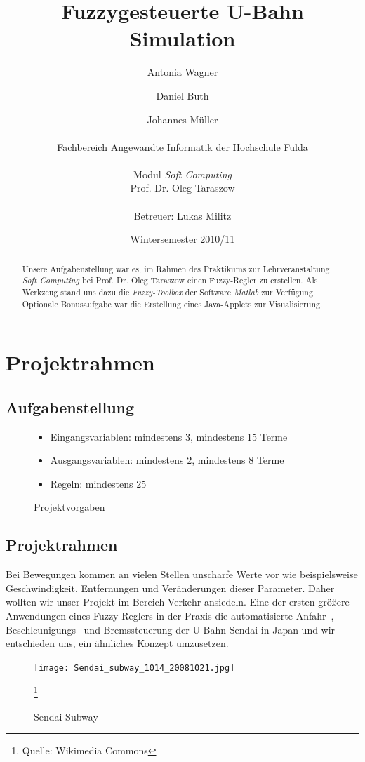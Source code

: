 \documentclass[10pt,a4paper]{article}
\author{Antonia Wagner \and Daniel Buth \and Johannes Müller \\ \\
Fachbereich Angewandte Informatik der Hochschule Fulda\\ \\
Modul \textit{Soft Computing}\\
Prof. Dr. Oleg Taraszow\\ \\
Betreuer: Lukas Militz
}
\title{Fuzzygesteuerte U-Bahn Simulation}
\date{Wintersemester 2010/11}
\begin{document}
\maketitle
\tableofcontents

\section{Projektrahmen}
\subsection{Aufgabenstellung}
\begin{abstract}
Unsere Aufgabenstellung war es, im Rahmen des Praktikums zur Lehrveranstaltung \textit{Soft Computing} bei Prof. Dr. Oleg Taraszow einen Fuzzy-Regler zu erstellen.
Als Werkzeug stand uns dazu die \textit{Fuzzy-Toolbox} der Software \textit{Matlab} zur Verfügung.
Optionale Bonusaufgabe war die Erstellung eines Java-Applets zur Visualisierung.
\end{abstract}

\begin{figure}[htb]
\begin{itemize}
	\item Eingangsvariablen: mindestens 3, mindestens 15 Terme
	\item Ausgangsvariablen: mindestens 2, mindestens 8 Terme
	\item Regeln: mindestens 25
\end{itemize}
\caption{Projektvorgaben}
\label{projektvorgaben}
\end{figure}

\subsection{Projektrahmen}
Bei Bewegungen kommen an vielen Stellen unscharfe Werte vor wie beispielsweise Geschwindigkeit, Entfernungen und Veränderungen dieser Parameter. Daher wollten wir unser Projekt im Bereich Verkehr ansiedeln.
Eine der ersten größere Anwendungen eines Fuzzy-Reglers in der Praxis die automatisierte Anfahr--, Beschleunigungs-- und Bremssteuerung der U-Bahn Sendai in Japan und wir entschieden uns, ein ähnliches Konzept umzusetzen.

\begin{figure}[htb]
\begin{center}
\leavevmode
\texttt{[image: Sendai\_subway\_1014\_20081021.jpg]}
\caption[Sendai Subway]{Sendai Subway}
\label{Sendai Subway}
\footnote{Quelle: Wikimedia Commons}
\end{center}
\end{figure}
\end{document}
